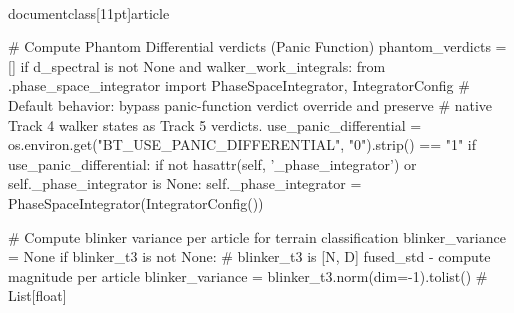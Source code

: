 \\documentclass[11pt]{article}
\begin{document}
\begin{CodeBlock}
                # Compute Phantom Differential verdicts (Panic Function)
                phantom_verdicts = []
                if d_spectral is not None and walker_work_integrals:
                    from .phase_space_integrator import PhaseSpaceIntegrator, IntegratorConfig
                    # Default behavior: bypass panic-function verdict override and preserve
                    # native Track 4 walker states as Track 5 verdicts.
                    use_panic_differential = os.environ.get("BT_USE_PANIC_DIFFERENTIAL", "0").strip() == "1"
                    if use_panic_differential:
                        if not hasattr(self, '_phase_integrator') or self._phase_integrator is None:
                            self._phase_integrator = PhaseSpaceIntegrator(IntegratorConfig())

                        # Compute blinker variance per article for terrain classification
                        blinker_variance = None
                        if blinker_t3 is not None:
                            # blinker_t3 is [N, D] fused_std - compute magnitude per article
                            blinker_variance = blinker_t3.norm(dim=-1).tolist()  # List[float]


\end{CodeBlock}
\end{document}
